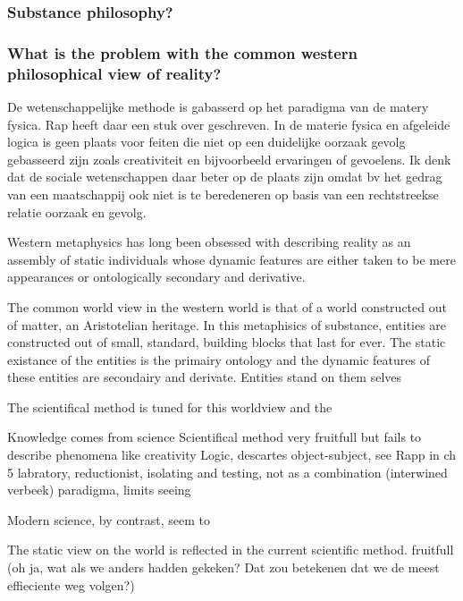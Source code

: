 
 

\subsubsection{Substance philosophy?}
\subsubsection{What is the problem with the common western philosophical view of reality?}
De wetenschappelijke methode is gabasserd op het paradigma van de matery fysica.
Rap heeft daar een stuk over geschreven.
In de materie fysica en afgeleide logica is geen plaats voor feiten die niet op een duidelijke oorzaak gevolg gebasseerd zijn zoals creativiteit en bijvoorbeeld ervaringen of gevoelens.
Ik denk dat de sociale wetenschappen daar beter op de plaats zijn omdat bv het gedrag van een maatschappij ook niet is te beredeneren op basis van een rechtstreekse relatie oorzaak en gevolg.

Western metaphysics has long been obsessed with describing reality as an assembly of static individuals whose dynamic features are either taken to be mere appearances or ontologically secondary and derivative. 

The common world view in the western world is that of a world constructed out of matter, an Aristotelian heritage. In this metaphisics of substance, entities are constructed out of small, standard, building blocks that last for ever. 
The static existance of the entities is the primairy ontology and the dynamic features of these entities are secondairy and derivate.
Entities stand on them selves

The scientifical method is tuned for this worldview and the 

Knowledge comes from science
Scientifical method very fruitfull but fails to describe phenomena like creativity
Logic, descartes object-subject, see Rapp in ch 5
labratory, reductionist, isolating and testing, not as a combination (interwined verbeek)
paradigma, limits seeing

Modern science, by contrast, seem to \cite[chapter 5]{rapp1990whitehad}


The static view on the world is reflected in the current scientific method.
fruitfull (oh ja, wat als we anders hadden gekeken? Dat zou betekenen dat we de meest effieciente weg volgen?)

